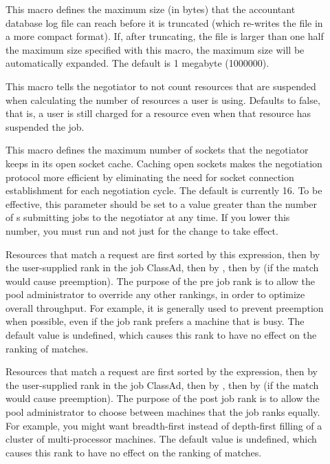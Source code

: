 \begin{description}
\item[] 
  \label{param:MaxAccountantDatabaseSize}
  This macro defines the maximum size (in bytes) that the accountant
  database log file can reach before it is truncated (which re-writes
  the file in a more compact format).
  If, after truncating, the file is larger than one half the maximum
  size specified with this macro, the maximum size will be
  automatically expanded.
  The default is 1 megabyte (1000000).

\item[] \label{param:NegotiatorDiscountSuspendedResources} 
   This macro tells the negotiator to not count resources that are suspended
   when calculating the number of resources a user is using. 
   Defaults to false, that is, a user is still charged for a resource even
   when that resource has suspended the job.

\item[]
  \label{param:NegotiatorSocketCacheSize} This macro defines the
  maximum number of sockets that the negotiator keeps in its
  open socket cache.  Caching open sockets makes the negotiation
  protocol more efficient by eliminating the need for socket
  connection establishment for each negotiation cycle.  The default is
  currently 16.  To be effective, this parameter should be set to a
  value greater than the number of s submitting jobs to the
  negotiator at any time.  If you lower this number, you must run
   and not just  for the change to
  take effect.

\item[]
  \label{param:NegotiatorPreJobRank} Resources that match a request
  are first sorted by this expression, then by the user-supplied rank
  in the job ClassAd, then by , then by
   (if the match would cause preemption).  The purpose
  of the pre job rank is to allow the pool administrator to override any
  other rankings, in order to optimize overall throughput.  For example,
  it is generally used to prevent preemption when possible, even if the job
  rank prefers a machine that is busy.
  The default value is undefined, which causes this rank
  to have no effect on the ranking of matches.

\item[]
  \label{param:NegotiatorPostJobRank} Resources that match a request
  are first sorted by the 
  expression, then by the user-supplied rank in the job ClassAd, then
  by , then by
   (if the match would cause preemption).  The
  purpose of the post job rank is to allow the pool administrator to
  choose between machines that the job ranks equally.  For example,
  you might want breadth-first instead of depth-first filling of a
  cluster of multi-processor machines.
  The default value is undefined, which causes this rank
  to have no effect on the ranking of matches.


\end{description}
